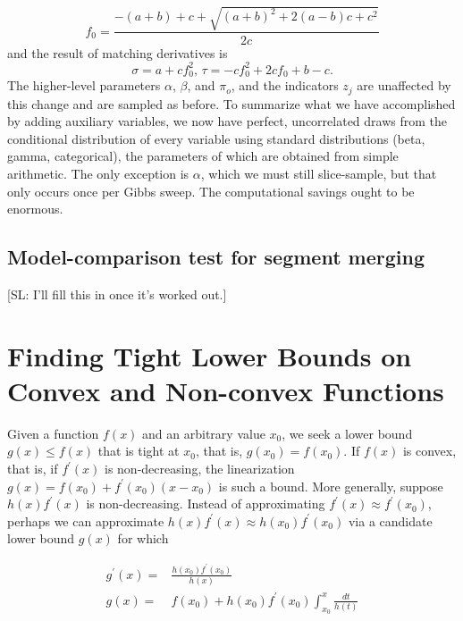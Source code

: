 \documentclass[nofootinbib,amssymb,amsmath]{revtex4}
\def\SL#1{{\color [rgb]{0,0,0.8} [SL: #1]}}
\begin{document}
%
\begin{equation}
f_0 = \frac{-(a+b) + c + \sqrt{(a+b)^2 + 2(a-b)c + c^2} }{2c}
\end{equation}
%
and the result of matching derivatives is
\begin{equation}
\sigma = a + c f_0^2, \, \tau = -c f_0^2 + 2 c f_0 + b - c.
\end{equation}
%
The higher-level parameters $\alpha$, $\beta$, and $\pi_o$, and the indicators $z_j$ are unaffected by this change and are sampled as before.  To summarize what we have accomplished by adding auxiliary variables, we now have perfect, uncorrelated draws from the conditional distribution of every variable using standard distributions (beta, gamma, categorical), the parameters of which are obtained from simple arithmetic.  The only exception is $\alpha$, which we must still slice-sample, but that only occurs once per Gibbs sweep.  The computational savings ought to be enormous.

\subsection{Model-comparison test for segment merging} \label{likelihood-based-segment-merging}

\SL{I'll fill this in once it's worked out.}

\appendix

\section{Finding Tight Lower Bounds on Convex and Non-convex Functions} \label{bounds}

Given a function $f(x)$ and an arbitrary value $x_0$, we seek a lower bound $g(x) \le f(x)$ that is tight at $x_0$, that is, $g(x_0) = f(x_0)$.  If $f(x)$ is convex, that is, if $f^\prime(x)$ is non-decreasing, the linearization $g(x) = f(x_0) + f^\prime(x_0)(x-x_0)$ is such a bound.  More generally, suppose $h(x) f^\prime(x)$ is non-decreasing.  Instead of approximating $f^\prime(x) \approx f^\prime(x_0)$, perhaps we can approximate $h(x) f^\prime(x) \approx h(x_0) f^\prime(x_0)$ via a candidate lower bound $g(x)$ for which

\begin{align}
g^\prime(x) =& \frac{ h(x_0) f^\prime(x_0) } {h(x)} \\
g(x) =& f(x_0) + h(x_0) f^\prime(x_0)  \int_{x_0}^x \frac{d t}{h(t)}
\end{align}
\end{document}
